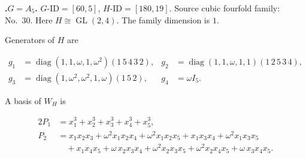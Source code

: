 \documentclass[12pt]{amsart}
\numberwithin{equation}{section}
\theoremstyle{plain}
\theoremstyle{definition}
\theoremstyle{remark}
\DeclareMathOperator{\GL}{GL}
\DeclareMathOperator{\diag}{diag}
\newenvironment{familydisplay}{%
  \begingroup
  \setlength{\arraycolsep}{1.35pt}%
  \renewcommand{\arraystretch}{0.96}%
  \setlength{\jot}{2pt}%
}{\endgroup}
\begin{document}
\par{}\medskip\noindent\textbf{.\enspace $G=A_5$.}\label{fam:threefold-no-7}
$G\text{-ID}=[60,5]$, $H\text{-ID}=[180,19]$.
Source cubic fourfold family: No.~30.  Here
$H\cong\GL(2,4)$.
The family dimension is $1$.
\par\smallskip\noindent Generators of $H$ are\par\nopagebreak
\begin{familydisplay}
\begin{align*}
g_{1}&=\diag(1,1,\omega,1,\omega^2)(1\,5\,4\,3\,2),
&
g_{2}&=\diag(1,1,\omega,1,1)(1\,2\,5\,3\,4),\\
g_{3}&=\diag(1,\omega^2,\omega^2,1,\omega)(1\,5\,2),
&
g_{4}&=\omega I_5.
\end{align*}
\end{familydisplay}
\par\smallskip\noindent A basis of $W_H$ is\par\nopagebreak
\begin{familydisplay}
\begin{alignat*}{2}
P_{1}&=x_{1}^{3}+x_{2}^{3}+x_{3}^{3}+x_{4}^{3}+x_{5}^{3},\\[2pt]
P_{2}&=x_{1}x_{2}x_{3}+\omega^2x_{1}x_{2}x_{4}+\omega^2x_{1}x_{2}x_{5}+x_{1}x_{3}x_{4}+\omega^2x_{1}x_{3}x_{5}\\
&\quad +x_{1}x_{4}x_{5}+\omega\,x_{2}x_{3}x_{4}+\omega^2x_{2}x_{3}x_{5}+\omega^2x_{2}x_{4}x_{5}+\omega\,x_{3}x_{4}x_{5}.\\[2pt]
\end{alignat*}
\end{familydisplay}
\end{document}

